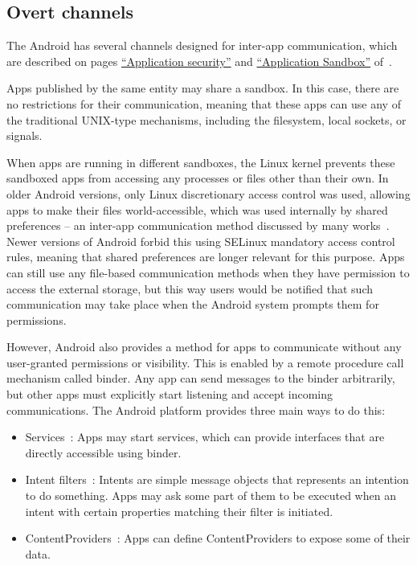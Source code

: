 \documentclass[article, oneside]{aaltoseries}
\renewcommand\gls\cgls
\begin{document}
\subsection{Overt channels}
\label{sec:overt}

The Android \gls{os} has several channels designed for inter-app communication, which are described on pages \href{https://source.android.com/security/overview/app-security}{``Application security''} and \href{https://source.android.com/security/app-sandbox}{``Application Sandbox''} of~\cite{AOSPsecurity}.

Apps published by the same entity may share a sandbox. In this case, there are no restrictions for their communication, meaning that these apps can use any of the traditional UNIX-type mechanisms, including the filesystem, local sockets, or signals.

When apps are running in different sandboxes, the Linux kernel prevents these sandboxed apps from accessing any processes or files other than their own. In older Android versions, only Linux discretionary access control was used, allowing apps to make their files world-accessible, which was used internally by shared preferences -- an inter-app communication method discussed by many works~\cite{Bhandari2017, Asavoae2017}. Newer versions of Android forbid this using SELinux mandatory access control rules, meaning that shared preferences are longer relevant for this purpose. Apps can still use any file-based communication methods when they have permission to access the external storage, but this way users would be notified that such communication may take place when the Android system prompts them for permissions.

However, Android also provides a method for apps to communicate without any user-granted permissions or visibility. This is enabled by a remote procedure call mechanism called binder. Any app can send messages to the binder arbitrarily, but other apps must explicitly start listening and accept incoming communications. The Android platform provides three main ways to do this:
\begin{itemize}
	\item Services~\cite[\href{https://developer.android.com/guide/components/services}{``Services overview''}]{AOSPdeveloper}: Apps may start services, which can provide interfaces that are directly accessible using binder.
	\item Intent filters~\cite[\href{https://developer.android.com/guide/components/intents-filters}{``Intents and Intent Filters''}]{AOSPdeveloper}: Intents are simple message objects that represents an intention to do something. Apps may ask some part of them to be executed when an intent with certain properties matching their filter is initiated.
	\item ContentProviders~\cite[\href{https://developer.android.com/guide/topics/providers/content-providers}{``Content providers''}]{AOSPdeveloper}: Apps can define ContentProviders to expose some of their data.
\end{itemize}
\end{document}
